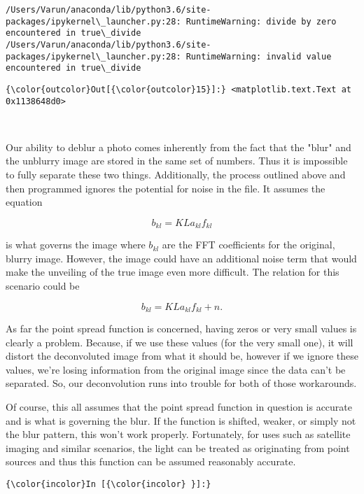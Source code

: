\documentclass[11pt]{article}
\begin{document}
    \begin{Verbatim}[commandchars=\\\{\}]
/Users/Varun/anaconda/lib/python3.6/site-packages/ipykernel\_launcher.py:28: RuntimeWarning: divide by zero encountered in true\_divide
/Users/Varun/anaconda/lib/python3.6/site-packages/ipykernel\_launcher.py:28: RuntimeWarning: invalid value encountered in true\_divide

    \end{Verbatim}

\begin{Verbatim}[commandchars=\\\{\}]
{\color{outcolor}Out[{\color{outcolor}15}]:} <matplotlib.text.Text at 0x1138648d0>
\end{Verbatim}
            
    \begin{center}
    \end{center}
    { \hspace*{\fill} \\}
    
    Our ability to deblur a photo comes inherently from the fact that the
"blur" and the unblurry image are stored in the same set of numbers.
Thus it is impossible to fully separate these two things. Additionally,
the process outlined above and then programmed ignores the potential for
noise in the file. It assumes the equation

\[b_{kl} =  KL{a}_{kl}f_{kl}\]

is what governs the image where \(b_{kl}\) are the FFT coefficients for
the original, blurry image. However, the image could have an additional
noise term that would make the unveiling of the true image even more
difficult. The relation for this scenario could be

\[b_{kl} =  KL{a}_{kl}f_{kl} + n.\]

As far the point spread function is concerned, having zeros or very
small values is clearly a problem. Because, if we use these values (for
the very small one), it will distort the deconvoluted image from what it
should be, however if we ignore these values, we're losing information
from the original image since the data can't be separated. So, our
deconvolution runs into trouble for both of those workarounds.

Of course, this all assumes that the point spread function in question
is accurate and is what is governing the blur. If the function is
shifted, weaker, or simply not the blur pattern, this won't work
properly. Fortunately, for uses such as satellite imaging and similar
scenarios, the light can be treated as originating from point sources
and thus this function can be assumed reasonably accurate.

    \begin{Verbatim}[commandchars=\\\{\}]
{\color{incolor}In [{\color{incolor} }]:} 
\end{Verbatim}


    
    
    
    
\end{document}
